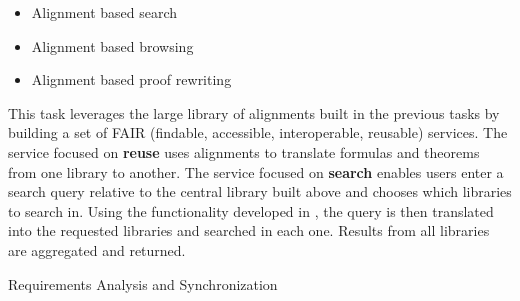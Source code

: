 \begin{workpackage}[id=alignment,wphases=0-48,type=RTD,
  short=Concept Alignment,%
  title=Concept Alignment,
  lead=Pra,
  BolRM=14, %
  PraRM=10]
\begin{tasklist}
  \begin{task}[id=alignservices,title=Alignment based services,lead=Fau]
    \begin{itemize}
    \item Alignment based search
    \item Alignment based browsing
    \item Alignment based proof rewriting
    \end{itemize}
    This task leverages the large library of alignments built in the
    previous tasks by building a set of FAIR (findable, accessible,
    interoperable, reusable) services. The service focused on
    \textbf{reuse} uses alignments to translate formulas and theorems
    from one library to another. The service focused on
    \textbf{search} enables users enter a search query relative to the
    central library built above and chooses which libraries to search
    in. Using the functionality developed in
    , the query is then translated into
    the requested libraries and searched in each one.  Results from
    all libraries are aggregated and returned.
  \end{task}
\end{tasklist}

\begin{wpdelivs}
  \begin{wpdeliv}[due=3,miles=startup,id=requirements,dissem=PU,nature=DEM,lead=Inr]
      {Requirements Analysis and Synchronization}
\end{wpdeliv}
\end{wpdelivs}
\end{workpackage}

